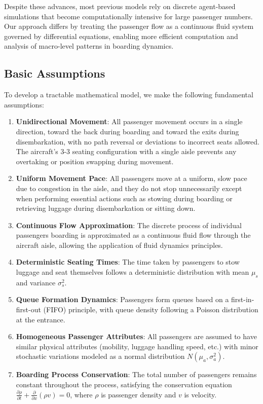 \documentclass[a4paper,12pt]{article}
\begin{document}
Despite these advances, most previous models rely on discrete agent-based simulations that become computationally intensive for large passenger numbers. Our approach differs by treating the passenger flow as a continuous fluid system governed by differential equations, enabling more efficient computation and analysis of macro-level patterns in boarding dynamics.

\subsection{Basic Assumptions}

To develop a tractable mathematical model, we make the following fundamental assumptions:

\begin{enumerate}
    \item \textbf{Unidirectional Movement}: All passenger movement occurs in a single direction, toward the back during boarding and toward the exits during disembarkation, with no path reversal or deviations to incorrect seats allowed. The aircraft's 3-3 seating configuration with a single aisle prevents any overtaking or position swapping during movement.

    \item \textbf{Uniform Movement Pace}: All passengers move at a uniform, slow pace due to congestion in the aisle, and they do not stop unnecessarily except when performing essential actions such as stowing during boarding or retrieving luggage during disembarkation or sitting down.

    \item \textbf{Continuous Flow Approximation}: The discrete process of individual passengers boarding is approximated as a continuous fluid flow through the aircraft aisle, allowing the application of fluid dynamics principles.

    \item \textbf{Deterministic Seating Times}: The time taken by passengers to stow luggage and seat themselves follows a deterministic distribution with mean $\mu_s$ and variance $\sigma_s^2$.

    \item \textbf{Queue Formation Dynamics}: Passengers form queues based on a first-in-first-out (FIFO) principle, with queue density following a Poisson distribution at the entrance.

    \item \textbf{Homogeneous Passenger Attributes}: All passengers are assumed to have similar physical attributes (mobility, luggage handling speed, etc.) with minor stochastic variations modeled as a normal distribution $N(\mu_a, \sigma_a^2)$.

    \item \textbf{Boarding Process Conservation}: The total number of passengers remains constant throughout the process, satisfying the conservation equation $\frac{\partial \rho}{\partial t} + \frac{\partial}{\partial x}(\rho v) = 0$, where $\rho$ is passenger density and $v$ is velocity.
\end{enumerate}
\end{document}
